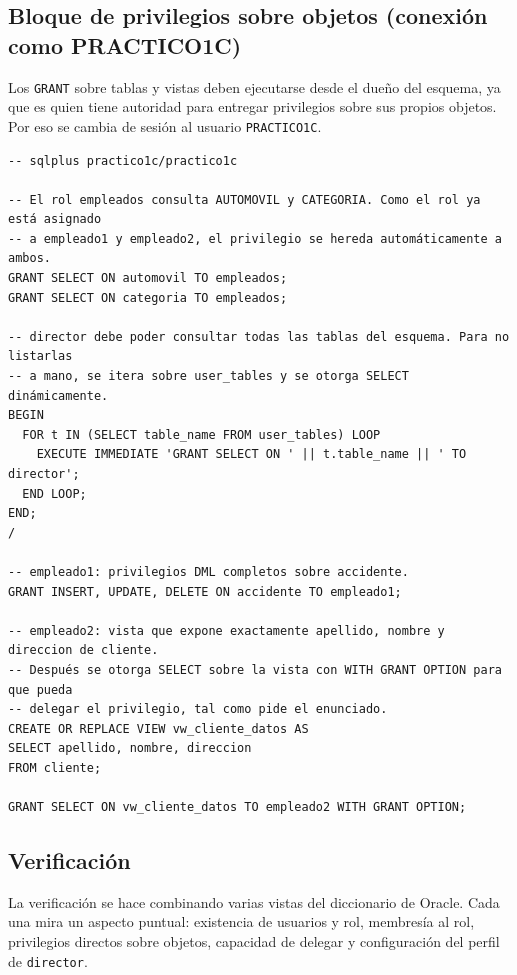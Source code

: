 \documentclass[11pt,a4paper]{article}
\begin{document}
\subsection{Bloque de privilegios sobre objetos (conexión como PRACTICO1C)}

Los \texttt{GRANT} sobre tablas y vistas deben ejecutarse desde el dueño del esquema, ya que es quien tiene autoridad para entregar privilegios sobre sus propios objetos. Por eso se cambia de sesión al usuario \texttt{PRACTICO1C}.

\begin{lstlisting}
-- sqlplus practico1c/practico1c

-- El rol empleados consulta AUTOMOVIL y CATEGORIA. Como el rol ya está asignado
-- a empleado1 y empleado2, el privilegio se hereda automáticamente a ambos.
GRANT SELECT ON automovil TO empleados;
GRANT SELECT ON categoria TO empleados;

-- director debe poder consultar todas las tablas del esquema. Para no listarlas
-- a mano, se itera sobre user_tables y se otorga SELECT dinámicamente.
BEGIN
  FOR t IN (SELECT table_name FROM user_tables) LOOP
    EXECUTE IMMEDIATE 'GRANT SELECT ON ' || t.table_name || ' TO director';
  END LOOP;
END;
/

-- empleado1: privilegios DML completos sobre accidente.
GRANT INSERT, UPDATE, DELETE ON accidente TO empleado1;

-- empleado2: vista que expone exactamente apellido, nombre y direccion de cliente.
-- Después se otorga SELECT sobre la vista con WITH GRANT OPTION para que pueda
-- delegar el privilegio, tal como pide el enunciado.
CREATE OR REPLACE VIEW vw_cliente_datos AS
SELECT apellido, nombre, direccion
FROM cliente;

GRANT SELECT ON vw_cliente_datos TO empleado2 WITH GRANT OPTION;
\end{lstlisting}

\subsection{Verificación}

La verificación se hace combinando varias vistas del diccionario de Oracle. Cada una mira un aspecto puntual: existencia de usuarios y rol, membresía al rol, privilegios directos sobre objetos, capacidad de delegar y configuración del perfil de \texttt{director}.
\end{document}
